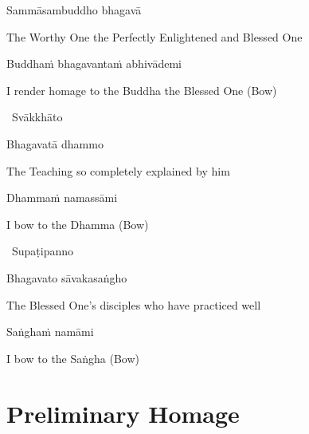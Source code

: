 \vspace{-0.5cm}

Sammāsambuddho bhagavā

\begin{english}
  The Worthy One the Perfectly Enlightened and Blessed One
\end{english}

Buddhaṁ bhagavantaṁ abhivādemi\relax

\begin{english}
  I render homage to the Buddha the Blessed One \hfill{(Bow)}
\end{english}

\begin{leader}
  \anglebracketleft\ \hspace{-0.5mm}Svākkhāto \hspace{-0.5mm}\anglebracketright\
\end{leader}

\vspace{-0.5cm}

Bhagavatā dhammo

\begin{english}
  The Teaching so completely explained by him
\end{english}

Dhammaṁ namassāmi\relax

\begin{english}
  I bow to the Dhamma \hfill{(Bow)}
\end{english}

\begin{leader}
  \anglebracketleft\ \hspace{-0.5mm}Supaṭipanno \hspace{-0.5mm}\anglebracketright\
\end{leader}

\vspace{-0.5cm}

Bhagavato sāvakasaṅgho

\begin{english}
  The Blessed One's disciples who have practiced well
\end{english}

Saṅghaṁ namāmi

\begin{english}
  I bow to the Saṅgha \hfill{(Bow)}
\end{english}

\section{Preliminary Homage}
\label{preliminary-homage}

